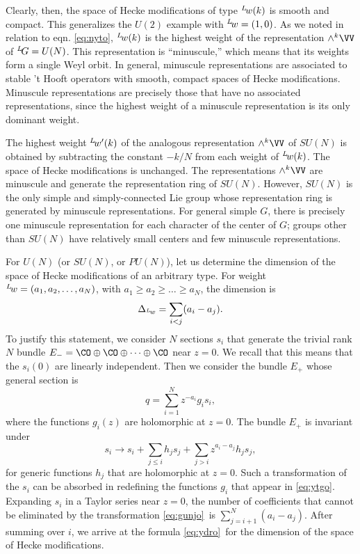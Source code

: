 Clearly, then, the space of Hecke modifications of type
$^L\negthinspace w(k)$
 is smooth and compact.  This generalizes the $U(2)$
example with $^L\negthinspace w=(1,0)$.  As we noted in relation
to eqn. \eqref{eq:nyto}, $^L\negthinspace w(k)$ is the highest weight of the
representation $\wedge^k\VV$ of $^L\negthinspace G=U(N)$.  This
representation is ``minuscule,'' which means that its weights form
a single Weyl orbit.  In general, minuscule representations  are
associated to stable 't Hooft operators with smooth, compact
spaces of Hecke modifications.  Minuscule representations are
precisely those that have no associated representations, since the
highest weight of a minuscule representation is its only dominant
weight.

The highest weight $^L\negthinspace w'(k)$ of the analogous
representation $\wedge^k\VV$ of $SU(N)$ is obtained by subtracting
the constant $-k/N$ from each weight of $^L\negthinspace w(k)$.
The space of Hecke modifications is unchanged.  The
representations $\wedge^k\VV$ are minuscule and generate the
representation ring of $SU(N)$. However, $SU(N)$ is the only
simple and simply-connected Lie group whose representation ring is
generated by minuscule representations. For general simple $G$,
there is precisely one minuscule representation for each character
of the center of $G$; groups other than $SU(N)$ have relatively
small centers and few minuscule representations.

\par{}

For $U(N)$ (or $SU(N)$, or $PU(N)$), let us determine the
dimension of the space of Hecke modifications of an arbitrary
type.  For weight $^L\negthinspace w=(a_1,a_2,\dots,a_N)$, with
$a_1\geq a_2\geq \dots\geq a_N$, the dimension is
\setcounter{equation}{24}
\begin{equation}\label{eq:ydro}
\Delta_{^L\negthinspace w}=\sum_{i<j}(a_i-a_j).
\end{equation}
 To
justify this statement, we consider $N$ sections $s_i$ that
generate the trivial rank $N$ bundle $E_-=\CO\oplus
\CO\oplus\dots\oplus\CO$ near $z=0$.  We recall that this means
that the $s_i(0)$ are linearly independent.  Then we consider the
bundle $E_+$ whose general section is
\setcounter{equation}{25}
\begin{equation}\label{eq:ytgo}
q=\sum_{i=1}^Nz^{-a_i}g_is_i,
\end{equation}
 where the functions
$g_i(z)$ are holomorphic at $z=0$.  The bundle $E_+$ is invariant
under %
\setcounter{equation}{26}
\begin{equation}\label{eq:gunjo}
s_i\to s_i+\sum_{j\leq
i}h_js_j+\sum_{j>i}z^{a_i-a_j}h_js_j,
\end{equation}
 for generic functions $h_j$
that are holomorphic at $z=0$. Such a transformation of the $s_i$
can be absorbed in redefining the functions $g_i$ that appear in
\eqref{eq:ytgo}. Expanding $s_i$ in a Taylor series near $z=0$, the number
of coefficients that cannot be eliminated by the transformation
\eqref{eq:gunjo}\ is $\sum_{j=i+1}^N(a_i-a_j)$.  After summing over $i$, we
arrive at the formula \eqref{eq:ydro}\ for the dimension of the space of
Hecke modifications.
